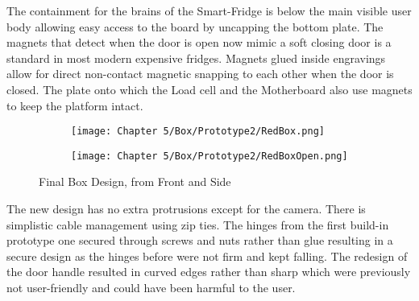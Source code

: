 The containment for the brains of the Smart-Fridge is below the main visible user body allowing easy access to the board by uncapping the bottom plate.
The magnets that detect when the door is open now mimic a soft closing door is a standard in most modern expensive fridges.
Magnets glued inside engravings allow for direct non-contact magnetic snapping to each other when the door is closed.
The plate onto which the Load cell and the Motherboard also use magnets to keep the platform intact.

\begin{figure}[H]
    \begin{subfigure}{.33\textwidth}
        \centering
        \texttt{[image: Chapter 5/Box/Prototype2/RedBox.png]}
    \end{subfigure}%
    \begin{subfigure}{.33\textwidth}
        \centering
        \texttt{[image: Chapter 5/Box/Prototype2/RedBoxOpen.png]}
    \end{subfigure}
    \caption{Final Box Design, from Front and Side}
\end{figure}

The new design has no extra protrusions except for the camera.
There is simplistic cable management using zip ties.
The hinges from the first build-in prototype one secured through screws and nuts rather than glue resulting in a secure design as the hinges before were not firm and kept falling.
The redesign of the door handle resulted in curved edges rather than sharp which were previously not user-friendly and could have been harmful to the user.